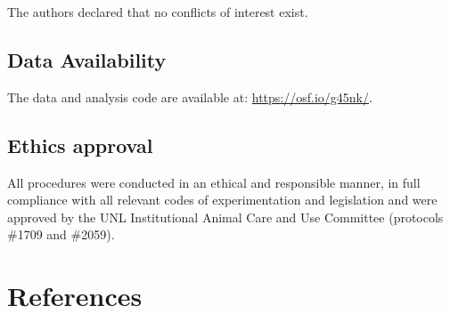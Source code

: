 \documentclass[
  ,pub,floatsintext]{apa6}
\begin{document}
The authors declared that no conflicts of interest exist.

\hypertarget{data-availability}{%
\subsection{Data Availability}\label{data-availability}}

The data and analysis code are available at: \url{https://osf.io/g45nk/}.

\hypertarget{ethics-approval}{%
\subsection{Ethics approval}\label{ethics-approval}}

All procedures were conducted in an ethical and responsible manner, in full compliance with all relevant codes of experimentation and legislation and were approved by the UNL Institutional Animal Care and Use Committee (protocols \#1709 and \#2059).

\hypertarget{references}{%
\section{References}\label{references}}

\scriptsize
\end{document}
